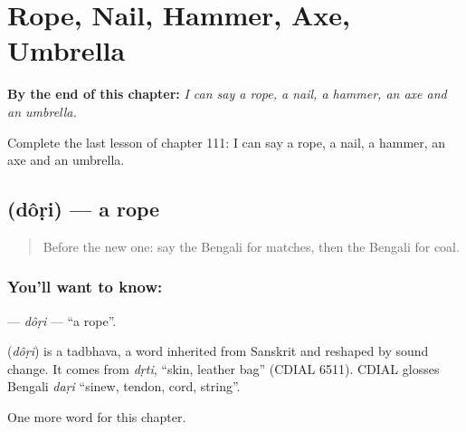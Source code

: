 
\chapter{Rope, Nail, Hammer, Axe, Umbrella}
\label{ch:bn-rope-nail-hammer-axe-umbrella}

\begin{chapteropening}
\textbf{By the end of this chapter:} \emph{I can say a rope, a nail, a hammer, an axe and an umbrella.}

Complete the last lesson of chapter 111: I can say a rope, a nail, a hammer, an axe and an umbrella.
\end{chapteropening}

\section[\texorpdfstring{\bn{দড়ি} (dôṛi)}{দড়ি (dôṛi)}]{ (dôṛi) — a rope}

\label{lesson:BN-C111-dori}



\begin{quote}
Before the new one: say the Bengali for matches, then the Bengali for coal.
\end{quote}

\subsection*{You'll want to know: }
\textbf{} — \emph{dôṛi} — \textquotedblleft{}a rope\textquotedblright{}.

\begin{cousinweb}
\textbf{} (\emph{dôṛi}) is a tadbhava, a word inherited from Sanskrit and reshaped by sound change. It comes from \emph{dṛti}, \textquotedblleft{}skin, leather bag\textquotedblright{} (CDIAL 6511). CDIAL glosses Bengali \emph{daṛi} \textquotedblleft{}sinew, tendon, cord, string\textquotedblright{}.
\end{cousinweb}

\begin{grammarlens}[title={What you've built}]
One more word for this chapter.
\end{grammarlens}

